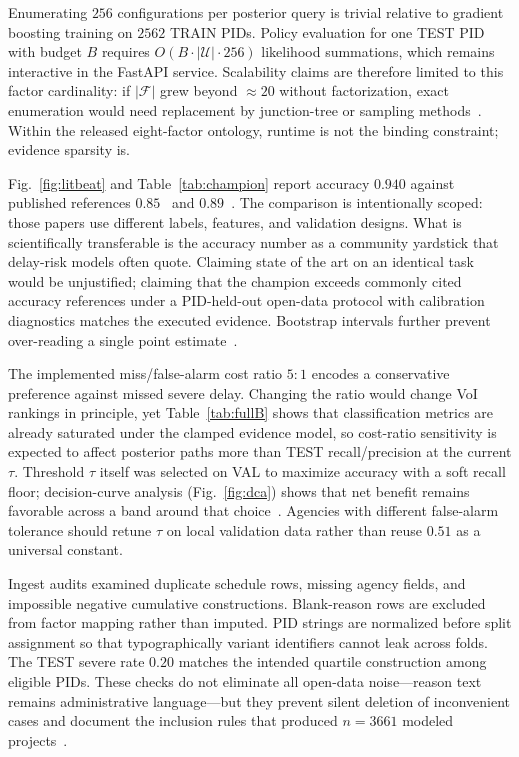 Enumerating $256$ configurations per posterior query is trivial relative to gradient boosting training on $2562$ TRAIN PIDs. Policy evaluation for one TEST PID with budget $B$ requires $O(B\cdot |\mathcal{U}|\cdot 256)$ likelihood summations, which remains interactive in the FastAPI service. Scalability claims are therefore limited to this factor cardinality: if $|\mathcal{F}|$ grew beyond ${\approx}20$ without factorization, exact enumeration would need replacement by junction-tree or sampling methods~\cite{Heckerman1996}. Within the released eight-factor ontology, runtime is not the binding constraint; evidence sparsity is.

Fig.~\ref{fig:litbeat} and Table~\ref{tab:champion} report accuracy $0.940$ against published references $0.85$~\cite{Khodabakhshian2025} and $0.89$~\cite{Tagharobi2025}. The comparison is intentionally scoped: those papers use different labels, features, and validation designs. What is scientifically transferable is the accuracy number as a community yardstick that delay-risk models often quote. Claiming state of the art on an identical task would be unjustified; claiming that the champion exceeds commonly cited accuracy references under a PID-held-out open-data protocol with calibration diagnostics matches the executed evidence. Bootstrap intervals further prevent over-reading a single point estimate~\cite{GneitingRaftery2007,Hand2009}.

The implemented miss/false-alarm cost ratio $5{:}1$ encodes a conservative preference against missed severe delay. Changing the ratio would change VoI rankings in principle, yet Table~\ref{tab:fullB} shows that classification metrics are already saturated under the clamped evidence model, so cost-ratio sensitivity is expected to affect posterior paths more than TEST recall/precision at the current $\tau$. Threshold $\tau$ itself was selected on VAL to maximize accuracy with a soft recall floor; decision-curve analysis (Fig.~\ref{fig:dca}) shows that net benefit remains favorable across a band around that choice~\cite{Vickers2006}. Agencies with different false-alarm tolerance should retune $\tau$ on local validation data rather than reuse $0.51$ as a universal constant.

Ingest audits examined duplicate schedule rows, missing agency fields, and impossible negative cumulative constructions. Blank-reason rows are excluded from factor mapping rather than imputed. PID strings are normalized before split assignment so that typographically variant identifiers cannot leak across folds. The TEST severe rate $0.20$ matches the intended quartile construction among eligible PIDs. These checks do not eliminate all open-data noise---reason text remains administrative language---but they prevent silent deletion of inconvenient cases and document the inclusion rules that produced $n{=}3661$ modeled projects~\cite{Woldesenbet2016}.

